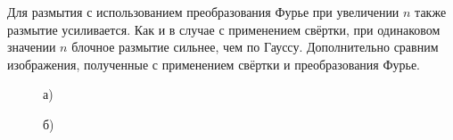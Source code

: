 \documentclass[a5paper, 10pt]{article}
\theoremstyle{definition}
\theoremstyle{plain}
\theoremstyle{remark}
\begin{document}
\newpage
Для размытия с использованием преобразования Фурье при увеличении $n$ также размытие усиливается. Как и в случае с применением свёртки, при одинаковом значении $n$ блочное размытие сильнее, чем по Гауссу.
\newpage
Дополнительно сравним изображения, полученные с применением свёртки и преобразования Фурье.

\begin{figure}[h!]
\begin{minipage}[h!]{0.47\linewidth}
 а) \\
\end{minipage}
\hfill
\begin{minipage}[h!]{0.47\linewidth}
 б) \\

\end{minipage}
\end{figure}
\end{document}
